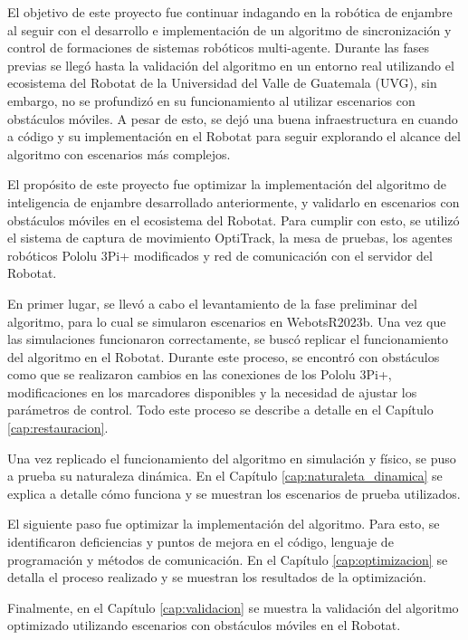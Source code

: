 El objetivo de este proyecto fue continuar indagando en la robótica de enjambre al seguir con el desarrollo e implementación de un algoritmo de sincronización y control de formaciones de sistemas robóticos multi-agente. Durante las fases previas se llegó hasta la validación del algoritmo en un entorno real utilizando el ecosistema del Robotat de la Universidad del Valle de Guatemala (UVG), sin embargo, no se profundizó en su funcionamiento al utilizar escenarios con obstáculos móviles. A pesar de esto, se dejó una buena infraestructura en cuando a código y su implementación en el Robotat para seguir explorando el alcance del algoritmo con escenarios más complejos.

El propósito de este proyecto fue optimizar la implementación del algoritmo de inteligencia de enjambre desarrollado anteriormente, y validarlo en escenarios con obstáculos móviles en el ecosistema del Robotat. Para cumplir con esto, se utilizó el sistema de captura de movimiento OptiTrack, la mesa de pruebas, los agentes robóticos Pololu 3Pi+ modificados y red de comunicación con el servidor del Robotat.

En primer lugar, se llevó a cabo el levantamiento de la fase preliminar del algoritmo, para lo cual se simularon escenarios en WebotsR2023b. Una vez que las simulaciones funcionaron correctamente, se buscó replicar el funcionamiento del algoritmo en el Robotat. Durante este proceso, se encontró con obstáculos como que se realizaron cambios en las conexiones de los Pololu 3Pi+, modificaciones en los marcadores disponibles y la necesidad de ajustar los parámetros de control. Todo este proceso se describe a detalle en el Capítulo \ref{cap:restauracion}.

Una vez replicado el funcionamiento del algoritmo en simulación y físico, se puso a prueba su naturaleza dinámica. En el Capítulo \ref{cap:naturaleta_dinamica} se explica a detalle cómo funciona y se muestran los escenarios de prueba utilizados.

El siguiente paso fue optimizar la implementación del algoritmo. Para esto, se identificaron deficiencias y puntos de mejora en el código, lenguaje de programación y métodos de comunicación. En el Capítulo \ref{cap:optimizacion} se detalla el proceso realizado y se muestran los resultados de la optimización.

Finalmente, en el Capítulo \ref{cap:validacion} se muestra la validación del algoritmo optimizado utilizando escenarios con obstáculos móviles en el Robotat.